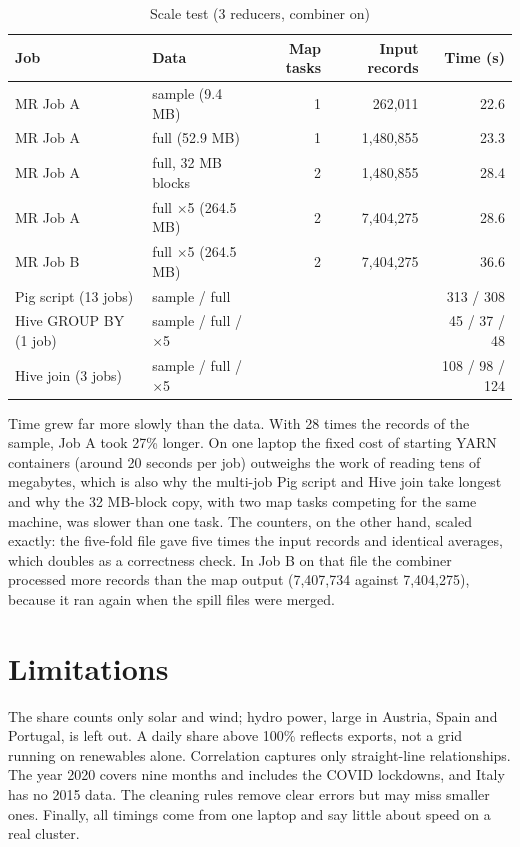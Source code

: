 \documentclass[12pt,a4paper]{report}
\begin{document}
\begin{table}[H]
\centering\small
\caption{Scale test (3 reducers, combiner on)}\label{tab:scale}
\footnotesize
\begin{tabularx}{\textwidth}{lXrrr}
\toprule
Job & Data & Map tasks & Input records & Time (s)\\
\midrule
MR Job A & sample (9.4 MB) & 1 & 262,011 & 22.6\\
MR Job A & full (52.9 MB) & 1 & 1,480,855 & 23.3\\
MR Job A & full, 32 MB blocks & 2 & 1,480,855 & 28.4\\
MR Job A & full $\times$5 (264.5 MB) & 2 & 7,404,275 & 28.6\\
MR Job B & full $\times$5 (264.5 MB) & 2 & 7,404,275 & 36.6\\
Pig script (13 jobs) & sample / full & & & 313 / 308\\
Hive GROUP BY (1 job) & sample / full / $\times$5 & & & 45 / 37 / 48\\
Hive join (3 jobs) & sample / full / $\times$5 & & & 108 / 98 / 124\\
\bottomrule
\end{tabularx}
\end{table}

Time grew far more slowly than the data. With 28 times the records of the sample, Job A took 27\% longer. On one laptop the fixed cost of starting YARN containers (around 20 seconds per job) outweighs the work of reading tens of megabytes, which is also why the multi-job Pig script and Hive join take longest and why the 32 MB-block copy, with two map tasks competing for the same machine, was slower than one task. The counters, on the other hand, scaled exactly: the five-fold file gave five times the input records and identical averages, which doubles as a correctness check. In Job B on that file the combiner processed more records than the map output (7,407,734 against 7,404,275), because it ran again when the spill files were merged.

\section{Limitations}
The share counts only solar and wind; hydro power, large in Austria, Spain and Portugal, is left out. A daily share above 100\% reflects exports, not a grid running on renewables alone. Correlation captures only straight-line relationships. The year 2020 covers nine months and includes the COVID lockdowns, and Italy has no 2015 data. The cleaning rules remove clear errors but may miss smaller ones. Finally, all timings come from one laptop and say little about speed on a real cluster.
\end{document}

